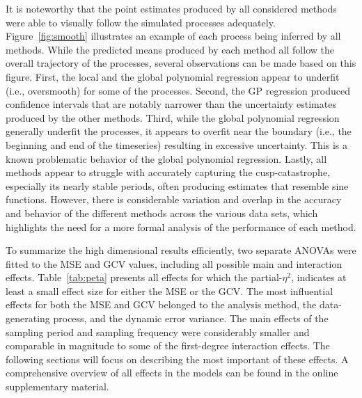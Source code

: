 \documentclass[man, floatsintext]{apa7}
\begin{document}
It is noteworthy that the point estimates produced by all considered methods
were able to visually follow the simulated processes adequately.
Figure~\ref{fig:smooth} illustrates an example of each process being inferred
by all methods. While the predicted means produced by each method all follow
the overall trajectory of the processes, several observations can be made based
on this figure. First, the local and the global polynomial regression appear to
underfit (i.e., oversmooth) for some of the processes. Second, the GP
regression produced confidence intervals that are notably narrower than the
uncertainty estimates produced by the other methods. Third, while the global
polynomial regression generally underfit the processes, it appears to overfit
near the boundary (i.e., the beginning and end of the timeseries) resulting in
excessive uncertainty. This is a known problematic behavior of the global
polynomial regression. Lastly, all methods appear to struggle with accurately
capturing the cusp-catastrophe, especially its nearly stable periods, often
producing estimates that resemble sine functions. However, there is
considerable variation and overlap in the accuracy and behavior of the
different methods across the various data sets, which highlights the need for a
more formal analysis of the performance of each method.

\begin{sidewaysfigure*}[htbp]
  \caption{Example processes inferred by each of the introduced methods}
  \label{fig:smooth}
\end{sidewaysfigure*}

To summarize the high dimensional results efficiently, two separate ANOVAs were
fitted to the MSE and GCV values, including all possible main and interaction
effects. Table~\ref{tab:peta} presents all effects for which the
partial-$\eta^2$, indicates at least a small effect size for either the MSE or
the GCV\@. The most influential effects for both the MSE and GCV belonged to
the analysis method, the data-generating process, and the dynamic error
variance. The main effects of the sampling period and sampling frequency were
considerably smaller and comparable in magnitude to some of the first-degree
interaction effects. The following sections will focus on describing the most
important of these effects. A comprehensive overview of all effects in the
models can be found in the online supplementary material.
\end{document}
